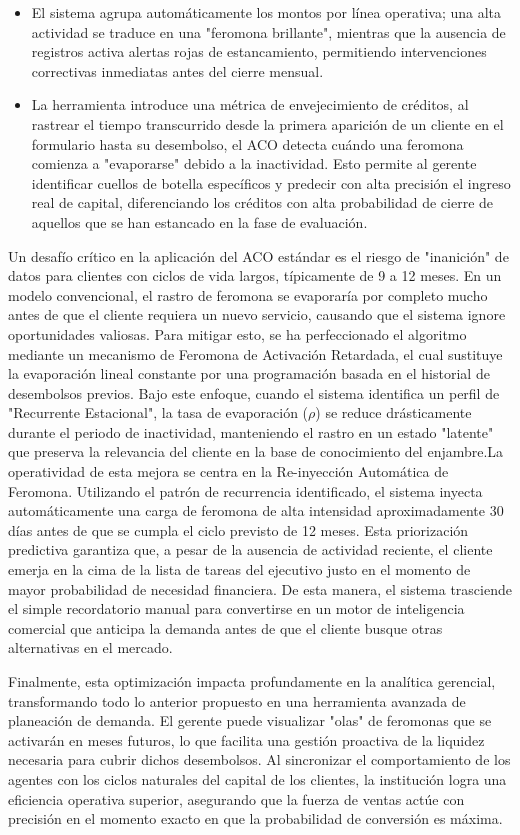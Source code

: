 \begin{itemize}
    \item El sistema agrupa automáticamente los montos por línea operativa; una alta actividad se traduce en una "feromona brillante", mientras que la ausencia de registros activa alertas rojas de estancamiento, permitiendo intervenciones correctivas inmediatas antes del cierre mensual.
    \item La herramienta introduce una métrica de envejecimiento de créditos, al rastrear el tiempo transcurrido desde la primera aparición de un cliente en el formulario hasta su desembolso, el ACO detecta cuándo una feromona comienza a "evaporarse" debido a la inactividad. Esto permite al gerente identificar cuellos de botella específicos y predecir con alta precisión el ingreso real de capital, diferenciando los créditos con alta probabilidad de cierre de aquellos que se han estancado en la fase de evaluación.
\end{itemize}



Un desafío crítico en la aplicación del ACO estándar es el riesgo de "inanición" de datos para clientes con ciclos de vida largos, típicamente de 9 a 12 meses. En un modelo convencional, el rastro de feromona se evaporaría por completo mucho antes de que el cliente requiera un nuevo servicio, causando que el sistema ignore oportunidades valiosas. Para mitigar esto, se ha perfeccionado el algoritmo mediante un mecanismo de Feromona de Activación Retardada, el cual sustituye la evaporación lineal constante por una programación basada en el historial de desembolsos previos. Bajo este enfoque, cuando el sistema identifica un perfil de "Recurrente Estacional", la tasa de evaporación ($\rho$) se reduce drásticamente durante el periodo de inactividad, manteniendo el rastro en un estado "latente" que preserva la relevancia del cliente en la base de conocimiento del enjambre.La operatividad de esta mejora se centra en la Re-inyección Automática de Feromona. Utilizando el patrón de recurrencia identificado, el sistema inyecta automáticamente una carga de feromona de alta intensidad aproximadamente 30 días antes de que se cumpla el ciclo previsto de 12 meses. Esta priorización predictiva garantiza que, a pesar de la ausencia de actividad reciente, el cliente emerja en la cima de la lista de tareas del ejecutivo justo en el momento de mayor probabilidad de necesidad financiera. De esta manera, el sistema trasciende el simple recordatorio manual para convertirse en un motor de inteligencia comercial que anticipa la demanda antes de que el cliente busque otras alternativas en el mercado.

Finalmente, esta optimización impacta profundamente en la analítica gerencial, transformando todo lo anterior propuesto en una herramienta avanzada de planeación de demanda. El gerente puede visualizar "olas" de feromonas que se activarán en meses futuros, lo que facilita una gestión proactiva de la liquidez necesaria para cubrir dichos desembolsos. Al sincronizar el comportamiento de los agentes con los ciclos naturales del capital de los clientes, la institución logra una eficiencia operativa superior, asegurando que la fuerza de ventas actúe con precisión en el momento exacto en que la probabilidad de conversión es máxima.